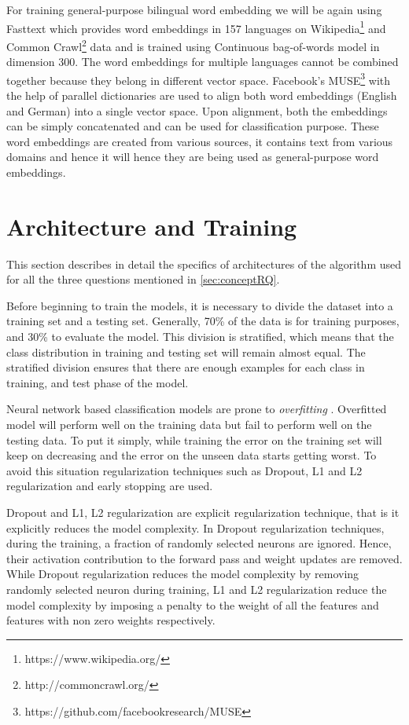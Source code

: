 For training general-purpose bilingual word embedding we will be again using Fasttext which provides word embeddings in 157 languages on Wikipedia\footnote{https://www.wikipedia.org/} and Common Crawl\footnote{http://commoncrawl.org/} data and is trained using Continuous bag-of-words model in dimension 300. The word embeddings for multiple languages cannot be combined together because they belong in different vector space. Facebook's MUSE\footnote{https://github.com/facebookresearch/MUSE} \cite{conneau2017word} with the help of parallel dictionaries are used to align both word embeddings (English and German) into a single vector space. Upon alignment, both the embeddings can be simply concatenated and can be used for classification purpose. These word embeddings are created from various sources, it contains text from various domains and hence it will hence they are being used as general-purpose word embeddings.

\section{Architecture and Training}
This section describes in detail the specifics of architectures of the algorithm used for all the three questions mentioned in \ref{sec:conceptRQ}.

Before beginning to train the models, it is necessary to divide the dataset into a training set and a testing set. Generally, 70\% of the data is for training purposes, and 30\% to evaluate the model. This division is stratified, which means that the class distribution in training and testing set will remain almost equal. The stratified division ensures that there are enough examples for each class in training, and test phase of the model. 

Neural network based classification models are prone to \textit{overfitting} \cite{Prechelt1998}. Overfitted model will perform well on the training data but fail to perform well on the testing data. To put it simply, while training the error on the training set will keep on decreasing and the error on the unseen data starts getting worst. To avoid this situation regularization techniques such as Dropout, L1 and L2 regularization and early stopping are used.

Dropout and L1, L2 regularization are explicit regularization technique, that is it explicitly reduces the model complexity. In Dropout regularization techniques, during the training, a fraction of randomly selected neurons are ignored. Hence, their activation contribution to the forward pass and weight updates are removed. While Dropout regularization reduces the model complexity by removing randomly selected neuron during training, L1 and L2 regularization reduce the model complexity by imposing a penalty to the weight of all the features and features with non zero weights respectively.      

